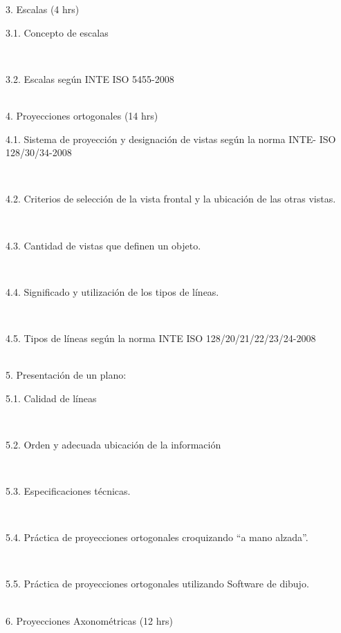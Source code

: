 \documentclass[letterpaper]{article}%
\begin{document}
\begin{tcolorbox}
3. Escalas (4 hrs)\\
\hspace*{0.02\linewidth}\parbox{0.98\linewidth}{\strut 3.1. Concepto de escalas\strut}\\
\hspace*{0.02\linewidth}\parbox{0.98\linewidth}{\strut 3.2. Escalas según INTE ISO 5455-2008\strut}\\
4. Proyecciones ortogonales (14 hrs)\\
\hspace*{0.02\linewidth}\parbox{0.98\linewidth}{\strut 4.1. Sistema de proyección y designación de vistas según la norma INTE- ISO 128/30/34-2008\strut}\\
\hspace*{0.02\linewidth}\parbox{0.98\linewidth}{\strut 4.2. Criterios de selección de la vista frontal y la ubicación de las otras vistas.\strut}\\
\hspace*{0.02\linewidth}\parbox{0.98\linewidth}{\strut 4.3. Cantidad de vistas que definen un objeto.\strut}\\
\hspace*{0.02\linewidth}\parbox{0.98\linewidth}{\strut 4.4. Significado y utilización de los tipos de líneas.\strut}\\
\hspace*{0.02\linewidth}\parbox{0.98\linewidth}{\strut 4.5. Tipos de líneas según la norma INTE ISO 128/20/21/22/23/24-2008\strut}\\
5. Presentación de un plano:\\
\hspace*{0.02\linewidth}\parbox{0.98\linewidth}{\strut 5.1. Calidad de líneas\strut}\\
\hspace*{0.02\linewidth}\parbox{0.98\linewidth}{\strut 5.2. Orden y adecuada ubicación de la información\strut}\\
\hspace*{0.02\linewidth}\parbox{0.98\linewidth}{\strut 5.3. Especificaciones técnicas.\strut}\\
\hspace*{0.02\linewidth}\parbox{0.98\linewidth}{\strut 5.4. Práctica de proyecciones ortogonales croquizando “a mano alzada”.\strut}\\
\hspace*{0.02\linewidth}\parbox{0.98\linewidth}{\strut 5.5. Práctica de proyecciones ortogonales utilizando Software de dibujo.\strut}\\
6. Proyecciones Axonométricas (12 hrs)\\

\end{tcolorbox}
\end{document}

